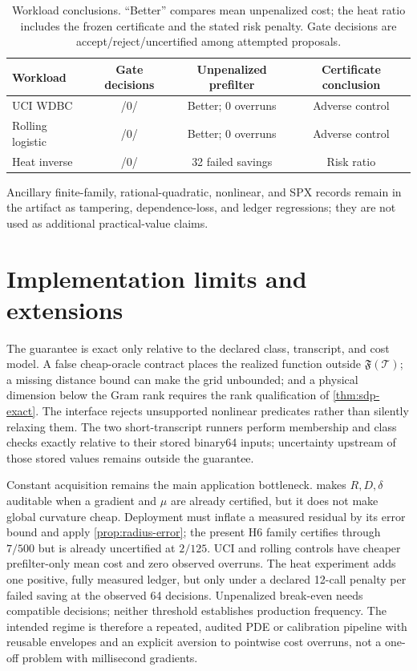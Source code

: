 \documentclass[smallextended]{svjour3}
\newcommand{\cT}{\mathcal{T}}
\begin{document}
\begin{table}[H]
\centering
\small
\caption{Workload conclusions.  ``Better'' compares mean unpenalized cost;
the heat ratio includes the frozen certificate and the stated risk penalty.
Gate decisions are accept/reject/uncertified among attempted proposals.}
\begin{tabular}{lccc}
\toprule
Workload & Gate decisions & Unpenalized prefilter & Certificate conclusion\\
\midrule
UCI WDBC & \UciWdbcAccepted{}/0/\UciWdbcUncertified{} & Better; 0 overruns & Adverse control\\
Rolling logistic & \RollingLogisticAccepted{}/0/\RollingLogisticUncertified{} & Better; 0 overruns & Adverse control\\
Heat inverse & \HeatAccepted{}/0/\HeatUncertified{} & 32 failed savings & Risk ratio \HeatGateRiskRatio{}\\
\bottomrule
\end{tabular}
\end{table}

Ancillary finite-family, rational-quadratic, nonlinear, and SPX records remain
in the artifact as tampering, dependence-loss, and ledger regressions; they are
not used as additional practical-value claims.

\section{Implementation limits and extensions}

The guarantee is exact only relative to the declared class, transcript, and
cost model.  A false cheap-oracle contract places the realized function outside
$\mathfrak F(\cT)$; a missing distance bound can make the grid unbounded; and a
physical dimension below the Gram rank requires the rank qualification of
\cref{thm:sdp-exact}.  The interface rejects unsupported nonlinear predicates
rather than silently relaxing them.  The two short-transcript runners perform
membership and class checks exactly relative to their stored binary64 inputs;
uncertainty upstream of those stored values remains outside the guarantee.

Constant acquisition remains the main application bottleneck.
 makes $R,D,\delta$ auditable when a gradient and
$\mu$ are already certified, but it does not make global curvature cheap.
Deployment must inflate a measured residual by its error bound and apply
\cref{prop:radius-error}; the present H6 family certifies through $7/500$ but is
already uncertified at $2/125$.  UCI and rolling controls have cheaper
prefilter-only mean cost and zero observed overruns.  The heat experiment adds
one positive, fully measured ledger, but only under a declared 12-call penalty
per failed saving at the observed 64 decisions.  Unpenalized break-even needs
\HeatUnpenalizedAmortizationEpisodes{} compatible decisions; neither threshold
establishes production frequency.  The intended regime is therefore a repeated, audited PDE or
calibration pipeline with reusable envelopes and an explicit aversion to
pointwise cost overruns, not a one-off problem with millisecond gradients.
\end{document}
